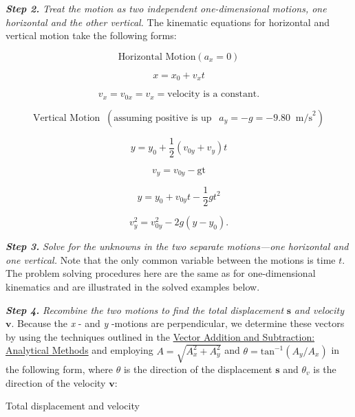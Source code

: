 \documentclass[
]{book}
\newenvironment{tinysection}{}{}
\begin{document}
\textbf{\emph{Step 2.}} \emph{Treat the motion as two independent one-dimensional
motions, one horizontal and the other vertical.} The kinematic equations
for horizontal and vertical motion take the following forms:

\leavevmode\hypertarget{eip-338}{}%
\[{\text{Horizontal\ Motion}({a_{x} = 0})}{}\]

\leavevmode\hypertarget{eip-362}{}%
\[{{x = {x_{0} + v_{x}}}t}{}\]

\leavevmode\hypertarget{eip-627}{}%
\[{{{v_{x} = v_{0x}} = v_{x}} = \text{velocity\ is\ a\ constant.}}{}\]

\leavevmode\hypertarget{eip-293}{}%
\[{\text{Vertical\ Motion}\operatorname{}(\text{assuming\ positive\ is\ up}\ \operatorname{}{{a_{y} = {- g}} = {{- 9.}\text{80}}}\operatorname{}\text{m/s}^{2})}{}\]

\leavevmode\hypertarget{eip-131}{}%
\[{{y = {y_{0} + \frac{1}{2}}}({v_{0y} + v_{y}})t}{}\]

\leavevmode\hypertarget{eip-305}{}%
\[{v_{y} = {v_{0y} - \text{gt}}}{}\]

\leavevmode\hypertarget{eip-542}{}%
\[{{y = {y_{0} + v_{0y}}}{t - \frac{1}{2}}{gt}^{2}}{}\]

\leavevmode\hypertarget{eip-243}{}%
\[{{v_{y}^{2} = {v_{0y}^{2} - 2g}}({y - y_{0}})\text{.}}{}\]

\textbf{\emph{Step 3.}} \emph{Solve for the unknowns in the two separate motions---one
horizontal and one vertical.} Note that the only common variable between
the motions is time \(t{}\). The problem solving procedures here are the
same as for one-dimensional {kinematics} and are
illustrated in the solved examples below.

\textbf{\emph{Step 4.}} \emph{Recombine the two motions to find the total displacement}
\(\textbf{s}\) \emph{and velocity} \(\textbf{v}{}\). Because the \emph{x} - and \emph{y}
-motions are perpendicular, we determine these vectors by using the
techniques outlined in the \href{/m54783}{Vector Addition and Subtraction: Analytical
Methods} and employing \({A = \sqrt{A_{x}^{2} + A_{y}^{2}}}{}\)
and \({{\theta = \text{tan}^{- 1}}({A_{y}/A_{x}})}{}\) in the following
form, where \(\theta{}\) is the direction of the displacement
\(\mathbf{s}{}\) and \(\theta_{v}{}\) is the direction of the velocity
\(\mathbf{v}{}\):

\begin{tinysection}

{Total displacement and velocity}

\end{tinysection}
\end{document}
